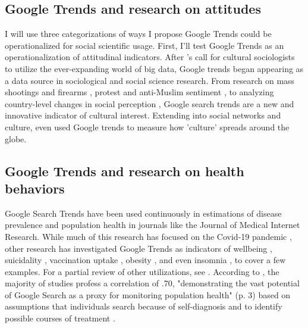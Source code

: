 \subsection{Google Trends and research on attitudes}

I will use three categorizations of ways I propose Google Trends could
be operationalized for social scientific usage. First, I'll test Google
Trends as an operationalization of attitudinal indicators. 
After \citet{bailCulturalEnvironmentMeasuring2014}'s call for
cultural sociologists to utilize the ever-expanding world of big data,
Google trends began appearing as a data source in sociological and
social science research. From research on mass shootings and firearms \citep{brownsteinInternetSearchPatterns2020, semenzaInformationseekingWakeTragedy2020}, 
protest and anti-Muslim sentiment \citep{bailUsingInternetSearch2018,barrieSearchingRacismGeorge2020,grossThereFergusonEffect2017},
to analyzing country-level changes in social perception \citep{reyes_etal18},
Google search trends are a new and innovative indicator of cultural interest.
Extending into social networks and culture, \citet{bailPrestigeProximityPrejudice2019}
even used Google trends to measure how 'culture' spreads around the globe.

\subsection{Google Trends and research on health behaviors}

Google Search Trends have been used continuously in estimations of
disease prevalence and population health in journals like the Journal of
Medical Internet Research. While much of this research has focused on
the Covid-19 pandemic \citep{jimenez_etal20, jimenezCOVID19SymptomGoogle2020, limEstimatingInformationSeekingBehaviour2020, mavraganiCOVID19PredictabilityUnited2020, nguyenGoogleTrendsAnalysis2020, todorovaInternetBasedData2021, mingUnderstandingHealthCommunication2021},
other research has investigated Google Trends as indicators of wellbeing
\citep{brodeurCOVID19LockdownsWellbeing2021, carpiTwitterSubjectiveWellBeing2020, duCOVID19IncreasesOnline2020},
suicidality \citep{burnettTimeTrendsPublic2020}, 
vaccination uptake \citep{dalumhansenEnsembleLearnedVaccination2016}, 
obesity \citep{sarigulNowcastingObesityUsing2014}, 
and even insomnia \citep{zittingGoogleTrendsReveal2020},
to cover a few examples. For a partial review of other utilizations, see \citet{nutiUseGoogleTrends2014}. According to
\citet{jaidkaInformationseekingVsSharing2021}, the majority of studies profess
a correlation of \> .70, "demonstrating the vast potential of Google
Search as a proxy for monitoring population health" (p. 3) based on
assumptions that individuals search because of self-diagnosis and to
identify possible courses of treatment \citep{dechoudhurySeekingSharingHealth2014}.


